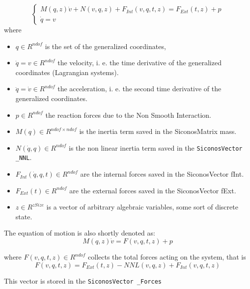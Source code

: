 \begin{equation}
  \begin{cases}
    M(q,z) \dot v + N(v, q, z) + F_{Int}(v , q , t, z) = F_{Ext}(t, z) + p \\
    \dot q = v
  \end{cases}
\end{equation}
 where 
 \begin{itemize}
 \item  $q \in R^{ndof} $ is the set of the generalized
   coordinates, 
 \item $ \dot q =v \in R^{ndof} $ the velocity,
   i. e. the time derivative of the generalized coordinates
   (Lagrangian systems).
 \item $ \ddot q =\dot v \in R^{ndof} $ the
   acceleration, i. e. the second time derivative of the generalized
   coordinates.  
 \item $ p \in R^{ndof} $ the reaction forces due to
   the Non Smooth Interaction.  
 \item $ M(q) \in R^{ndof \times ndof}
   $ is the inertia term saved in the SiconosMatrix mass.  
 \item $
   N(\dot q, q) \in R^{ndof}$ is the non linear inertia term saved
   in the {\tt SiconosVector \_NNL}.  
 \item $ F_{Int}(\dot q , q , t) \in
   R^{ndof} $ are the internal forces saved in the SiconosVector
   fInt.  
 \item $ F_{Ext}(t) \in R^{ndof} $ are the external forces
   saved in the SiconosVector fExt.  
 \item $ z \in R^{zSize}$ is a
   vector of arbitrary algebraic variables, some sort of discrete
   state.
 \end{itemize}

 
  The equation of motion is also shortly denoted as:
  \begin{equation}
  M(q,z) \dot v = F(v, q, t, z) + p
\end{equation}
 
  where  $F(v, q, t, z) \in R^{ndof} $ collects the total forces
  acting on the system, that is 
  \begin{equation}
    F(v, q, t, z) =  F_{Ext}(t, z) -  NNL(v, q, z) + F_{Int}(v, q , t, z) 
\end{equation}

 This vector is stored in the  {\tt SiconosVector \_Forces  }  


